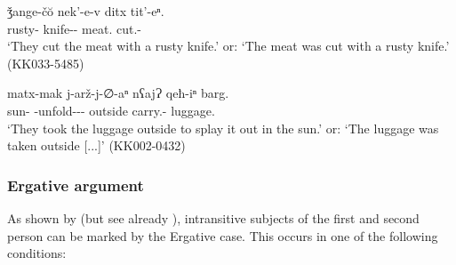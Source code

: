 \begin{exe}
	\ex\label{verbderiv-ex21}
	\begin{xlist}
		
		
			\ex\label{verbderiv-ex21a}
			\gll ǯange-č\u{o} nek'-e-v ditx tit'-eⁿ.\\
			rusty-{\Obl} knife-{\Obl}-{\Ins} meat.\textbf{{\Nom}} cut.{\Pfv}-{\Aor}\\
			\trans `They cut the meat with a rusty knife.' or: `The meat was cut with a rusty knife.' 
			\hfill (KK033-5485)
		
		
		
			\ex\label{verbderiv-ex21b}
			\gll matx-mak j-arž-j-∅-aⁿ nʕajɁ qeħ-iⁿ barg.\\
			sun-{\Superlat} {\J}-unfold-{\J}-{\Tr}-{\Inf} outside carry.{\Ipfv}-{\Aor} luggage.\textbf{{\Nom}}\\
			\trans `They took the luggage outside to splay it out in the sun.' or: `The luggage was taken outside [...]'
			\hfill (KK002-0432)
		
		
		
	\end{xlist}
\end{exe}



\subsubsection{Ergative argument} \label{intrerg}

As shown by \textcite{holisky87} (but see already \cite[73]{schiefner59,holisky84}), intransitive subjects of the first and second person can be marked by the Ergative case. This occurs in one of the following conditions:

